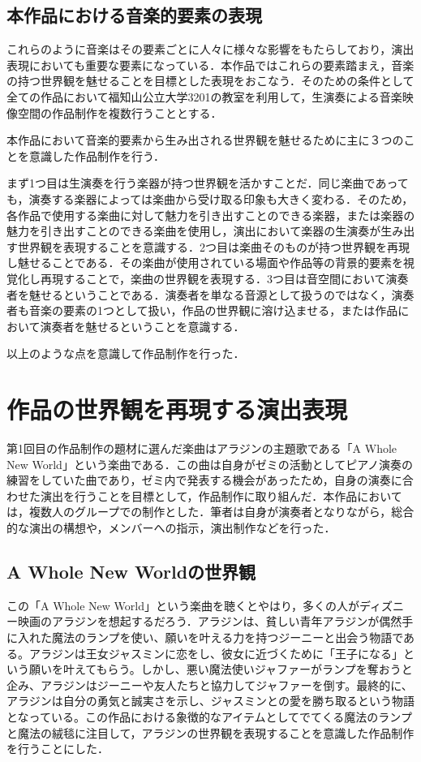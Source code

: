 \documentclass[submit,techrep,noauthor]{ipsj}
\begin{document}
\subsection{本作品における音楽的要素の表現}
これらのように音楽はその要素ごとに人々に様々な影響をもたらしており，演出表現においても重要な要素になっている．本作品ではこれらの要素踏まえ，音楽の持つ世界観を魅せることを目標とした表現をおこなう．そのための条件として全ての作品において福知山公立大学3201の教室を利用して，生演奏による音楽映像空間の作品制作を複数行うこととする．

本作品において音楽的要素から生み出される世界観を魅せるために主に３つのことを意識した作品制作を行う．

まず1つ目は生演奏を行う楽器が持つ世界観を活かすことだ．同じ楽曲であっても，演奏する楽器によっては楽曲から受け取る印象も大きく変わる．そのため，各作品で使用する楽曲に対して魅力を引き出すことのできる楽器，または楽器の魅力を引き出すことのできる楽曲を使用し，演出において楽器の生演奏が生み出す世界観を表現することを意識する．2つ目は楽曲そのものが持つ世界観を再現し魅せることである．その楽曲が使用されている場面や作品等の背景的要素を視覚化し再現することで，楽曲の世界観を表現する．3つ目は音空間において演奏者を魅せるということである．演奏者を単なる音源として扱うのではなく，演奏者も音楽の要素の1つとして扱い，作品の世界観に溶け込ませる，または作品において演奏者を魅せるということを意識する．

以上のような点を意識して作品制作を行った．





\section{作品の世界観を再現する演出表現}
第1回目の作品制作の題材に選んだ楽曲はアラジンの主題歌である「A Whole New World」\cite{Aladdin}という楽曲である．この曲は自身がゼミの活動としてピアノ演奏の練習をしていた曲であり，ゼミ内で発表する機会があったため，自身の演奏に合わせた演出を行うことを目標として，作品制作に取り組んだ．本作品においては，複数人のグループでの制作とした．筆者は自身が演奏者となりながら，総合的な演出の構想や，メンバーへの指示，演出制作などを行った．

\subsection{A Whole New Worldの世界観}
この「A Whole New World」という楽曲を聴くとやはり，多くの人がディズニー映画のアラジンを想起するだろう．アラジンは、貧しい青年アラジンが偶然手に入れた魔法のランプを使い、願いを叶える力を持つジーニーと出会う物語である。アラジンは王女ジャスミンに恋をし、彼女に近づくために「王子になる」という願いを叶えてもらう。しかし、悪い魔法使いジャファーがランプを奪おうと企み、アラジンはジーニーや友人たちと協力してジャファーを倒す。最終的に、アラジンは自分の勇気と誠実さを示し、ジャスミンとの愛を勝ち取るという物語となっている。この作品における象徴的なアイテムとしてでてくる魔法のランプと魔法の絨毯に注目して，アラジンの世界観を表現することを意識した作品制作を行うことにした．
\end{document}
